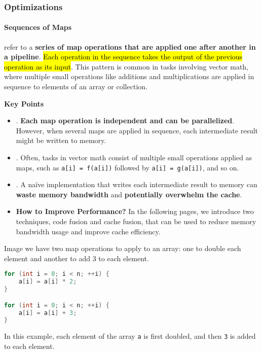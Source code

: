 \subsubsection{Optimizations}

\paragraph{Sequences of Maps}

 refer to a \textbf{series of map operations that are applied one after another in a pipeline}. \hl{Each operation in the sequence takes the output of the previous operation as its input}. This pattern is common in tasks involving vector math, where multiple small operations like additions and multiplications are applied in sequence to elements of an array or collection.

\highspace
\begin{flushleft}
    \textcolor{Green3}{ \textbf{Key Points}}
\end{flushleft}
\begin{itemize}
    \item {}. \textbf{Each map operation is independent and can be parallelized}. However, when several maps are applied in sequence, each intermediate result might be written to memory.

    \item {}. Often, tasks in vector math consist of multiple small operations applied as maps, such as \texttt{a[i] = f(a[i])} followed by \texttt{a[i] = g(a[i])}, and so on.

    \item[\textcolor{red}{\faIcon{times}}] . A naïve implementation that writes each intermediate result to memory can \textbf{waste memory bandwidth} and \textbf{potentially overwhelm the cache}.
    
    \item[\textcolor{Green3}{\faIcon{tachometer-alt}}] \textcolor{Green3}{\textbf{How to Improve Performance?}} In the following pages, we introduce two techniques, code fusion and cache fusion, that can be used to reduce memory bandwidth usage and improve cache efficiency.
\end{itemize}

\highspace
\begin{examplebox}
    Image we have two map operations to apply to an array: one to double each element and another to add 3 to each element.
    \begin{lstlisting}[language=c]
for (int i = 0; i < n; ++i) {
    a[i] = a[i] * 2;
}

for (int i = 0; i < n; ++i) {
    a[i] = a[i] + 3;
}\end{lstlisting}
    In this example, each element of the array \texttt{a} is first doubled, and then \texttt{3} is added to each element.
\end{examplebox}
